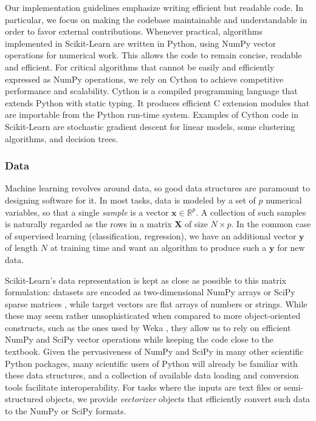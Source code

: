 Our implementation guidelines emphasize writing efficient but readable code. In
particular, we focus on making the codebase maintainable and understandable in
order to favor external contributions. Whenever practical, algorithms
implemented in Scikit-Learn are written in Python, using NumPy vector
operations for numerical work. This allows the code to remain concise, readable
and efficient. For critical algorithms that cannot be easily and efficiently
expressed as NumPy operations, we rely on Cython \citep{behnel:2011} to achieve
competitive performance and scalability. Cython is a compiled programming
language that extends Python with static typing. It produces efficient C
extension modules that are importable from the Python run-time system. Examples
of Cython code in Scikit-Learn are stochastic gradient descent for linear
models, some clustering algorithms, and decision trees.

\subsubsection{Data}

Machine learning revolves around data, so good data structures are paramount to
designing software for it. In most tasks, data is modeled by a set of $p$
numerical variables, so that a single \textit{sample} is a vector $\mathbf{x}
\in \mathbb{R}^p$. A collection of such samples is naturally regarded as the
rows in a matrix $\mathbf{X}$ of size $N \times p$. In the common case of
supervised learning (classification, regression), we have an additional vector
$\mathbf{y}$ of length $N$ at training time and want an algorithm to produce
such a $\mathbf{y}$ for new data.

Scikit-Learn's data representation is kept as close as possible to this matrix
formulation: datasets are encoded as two-dimensional NumPy arrays or SciPy
sparse matrices \citep{vanderwalt:2011}, while target vectors are flat
arrays of numbers or strings. While these may seem rather unsophisticated when
compared to more object-oriented constructs, such as the ones used by Weka
\citep{hall:2009}, they allow us to rely on efficient NumPy and SciPy vector
operations while keeping the code close to the textbook. Given the
pervasiveness of NumPy and SciPy in many other scientific Python packages, many
scientific users of Python will already be familiar with these data structures,
and a collection of available data loading and conversion tools facilitate
interoperability. For tasks where the inputs are text files or semi-structured
objects, we provide \textit{vectorizer} objects that efficiently convert such
data to the NumPy or SciPy formats.


